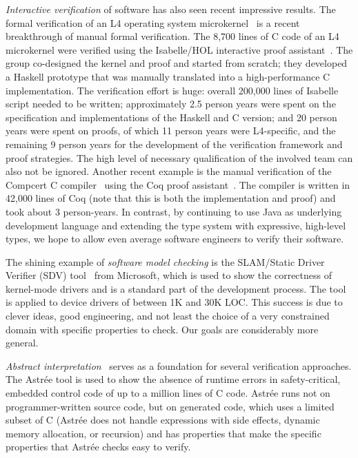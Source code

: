 \documentclass[preprint]{sig-alternate}
\newcommand{\todo}[1]{{\color{red}\bfseries [[#1]]}}
\begin{document}
\emph{Interactive verification} of software has also seen recent impressive
results.
The formal verification of an L4 operating system
microkernel~\cite{Klein_EHACDEEKNSTW_10}
is a recent breakthrough of manual formal verification.
The 8,700 lines of C code of an L4 microkernel were verified using the
Isabelle/HOL interactive proof assistant~\cite{Isabelle2002}.
The group co-designed the kernel and proof and started from scratch;
they developed a Haskell prototype that was manually translated into a
high-performance C implementation.
The verification effort is huge:
overall 200,000 lines of Isabelle script needed to be written;
approximately 2.5 person years were spent on the specification and
implementations of the Haskell and C version; and
20 person years were spent on proofs, of which 11 person years were
L4-specific, and the remaining 9 person years for the development of the
verification framework and proof strategies. 
The high level of necessary qualification of the involved team can
also not be ignored.
Another recent example is the manual verification of the Compcert C
compiler~\cite{Leroy2009} using the Coq proof assistant~\cite{Coq2004}.
The compiler is written in 42,000 lines of Coq (note that this is both
the implementation and proof) and took about 3 person-years.
In contrast, by continuing to use Java as underlying development
language and extending the type system with expressive, high-level
types, we hope to allow even average software engineers to verify
their software.


The shining example of \emph{software model checking}
is the SLAM/Static Driver Verifier (SDV)
tool~\cite{BallMMR2001,BallBKL2010,BallLR2011} from Microsoft, which
is used to show the correctness of kernel-mode drivers and is a standard
part of the development process.
The tool is applied to device drivers of between 1K and 30K LOC\@.
This success is due to clever ideas, good engineering, and not least the
choice of a very constrained domain with specific properties to check.  Our
goals are considerably more general.

\newcommand\astree{Astr\'{e}e}

\emph{Abstract interpretation}~\cite{CousotCousot1977,Cousot2007}
serves as a foundation for several verification approaches.
The \astree{} tool is used to show the absence of runtime errors in
safety-critical, embedded control code of up to a million lines of C
code.
\astree{} runs not on
programmer-written source code, but on generated code, which uses a limited
subset of C (\astree{} does not handle expressions with side effects,
dynamic memory allocation, or recursion) and has properties
that make the specific properties that \astree{} checks easy to verify.
\end{document}

